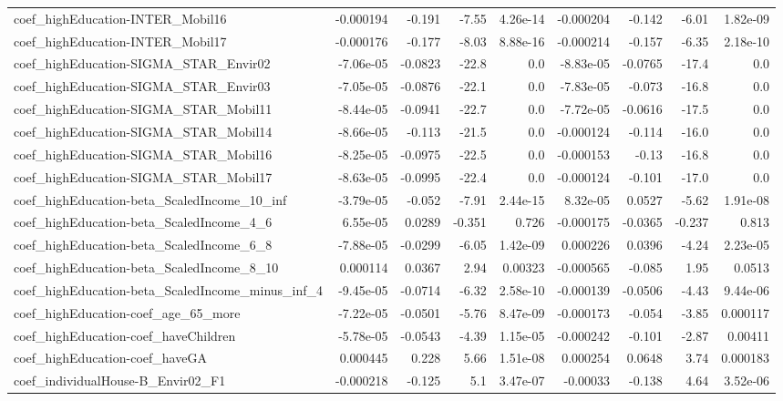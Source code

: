 \begin{tabular}{lrrrrrrrr}
coef_highEducation-INTER_Mobil16 & -0.000194 & -0.191 & -7.55 & 4.26e-14 & -0.000204 & -0.142 & -6.01 & 1.82e-09 \\
coef_highEducation-INTER_Mobil17 & -0.000176 & -0.177 & -8.03 & 8.88e-16 & -0.000214 & -0.157 & -6.35 & 2.18e-10 \\
coef_highEducation-SIGMA_STAR_Envir02 & -7.06e-05 & -0.0823 & -22.8 & 0.0 & -8.83e-05 & -0.0765 & -17.4 & 0.0 \\
coef_highEducation-SIGMA_STAR_Envir03 & -7.05e-05 & -0.0876 & -22.1 & 0.0 & -7.83e-05 & -0.073 & -16.8 & 0.0 \\
coef_highEducation-SIGMA_STAR_Mobil11 & -8.44e-05 & -0.0941 & -22.7 & 0.0 & -7.72e-05 & -0.0616 & -17.5 & 0.0 \\
coef_highEducation-SIGMA_STAR_Mobil14 & -8.66e-05 & -0.113 & -21.5 & 0.0 & -0.000124 & -0.114 & -16.0 & 0.0 \\
coef_highEducation-SIGMA_STAR_Mobil16 & -8.25e-05 & -0.0975 & -22.5 & 0.0 & -0.000153 & -0.13 & -16.8 & 0.0 \\
coef_highEducation-SIGMA_STAR_Mobil17 & -8.63e-05 & -0.0995 & -22.4 & 0.0 & -0.000124 & -0.101 & -17.0 & 0.0 \\
coef_highEducation-beta_ScaledIncome_10_inf & -3.79e-05 & -0.052 & -7.91 & 2.44e-15 & 8.32e-05 & 0.0527 & -5.62 & 1.91e-08 \\
coef_highEducation-beta_ScaledIncome_4_6 & 6.55e-05 & 0.0289 & -0.351 & 0.726 & -0.000175 & -0.0365 & -0.237 & 0.813 \\
coef_highEducation-beta_ScaledIncome_6_8 & -7.88e-05 & -0.0299 & -6.05 & 1.42e-09 & 0.000226 & 0.0396 & -4.24 & 2.23e-05 \\
coef_highEducation-beta_ScaledIncome_8_10 & 0.000114 & 0.0367 & 2.94 & 0.00323 & -0.000565 & -0.085 & 1.95 & 0.0513 \\
coef_highEducation-beta_ScaledIncome_minus_inf_4 & -9.45e-05 & -0.0714 & -6.32 & 2.58e-10 & -0.000139 & -0.0506 & -4.43 & 9.44e-06 \\
coef_highEducation-coef_age_65_more & -7.22e-05 & -0.0501 & -5.76 & 8.47e-09 & -0.000173 & -0.054 & -3.85 & 0.000117 \\
coef_highEducation-coef_haveChildren & -5.78e-05 & -0.0543 & -4.39 & 1.15e-05 & -0.000242 & -0.101 & -2.87 & 0.00411 \\
coef_highEducation-coef_haveGA & 0.000445 & 0.228 & 5.66 & 1.51e-08 & 0.000254 & 0.0648 & 3.74 & 0.000183 \\
coef_individualHouse-B_Envir02_F1 & -0.000218 & -0.125 & 5.1 & 3.47e-07 & -0.00033 & -0.138 & 4.64 & 3.52e-06 \\

\end{tabular}
